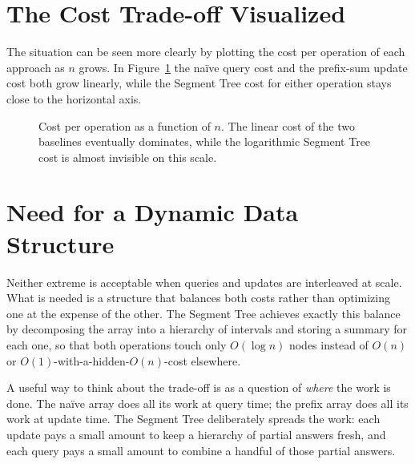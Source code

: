 \documentclass[
  11pt,
  a4paper,
  twoside=false,
  numbers=noenddot,
  headings=big,
  parskip=half,
  toc=bibliography,
  toc=listof,
  bibliography=totoc
]{scrreprt}
\begin{document}
\section{The Cost Trade-off Visualized}
The situation can be seen more clearly by plotting the cost per operation of each approach as $n$ grows. In Figure~\ref{fig:tradeoffplot} the na\"ive query cost and the prefix-sum update cost both grow linearly, while the Segment Tree cost for either operation stays close to the horizontal axis.

\begin{figure}[h]
\centering
{}
\caption{Cost per operation as a function of $n$. The linear cost of the two baselines eventually dominates, while the logarithmic Segment Tree cost is almost invisible on this scale.}
\label{fig:tradeoffplot}
\end{figure}

\section{Need for a Dynamic Data Structure}
Neither extreme is acceptable when queries and updates are interleaved at scale. What is needed is a structure that balances both costs rather than optimizing one at the expense of the other. The Segment Tree achieves exactly this balance by decomposing the array into a hierarchy of intervals and storing a summary for each one, so that both operations touch only $O(\log n)$ nodes instead of $O(n)$ or $O(1)$-with-a-hidden-$O(n)$-cost elsewhere.

\begin{remark}
A useful way to think about the trade-off is as a question of \emph{where} the work is done. The na\"ive array does all its work at query time; the prefix array does all its work at update time. The Segment Tree deliberately spreads the work: each update pays a small amount to keep a hierarchy of partial answers fresh, and each query pays a small amount to combine a handful of those partial answers.
\end{remark}
\end{document}

